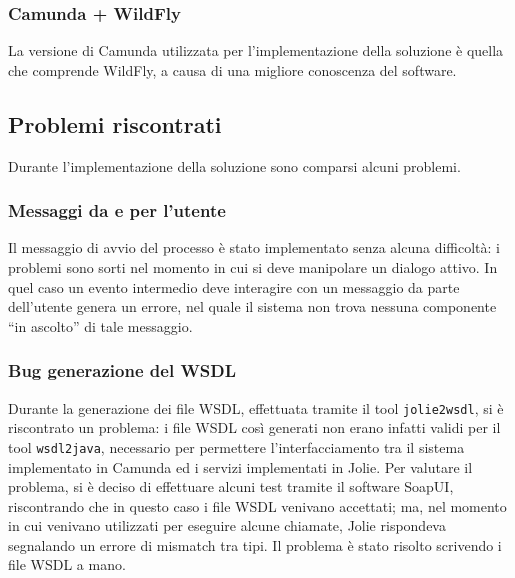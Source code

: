 \subsubsection{Camunda + WildFly}
La versione di Camunda utilizzata per l'implementazione della soluzione
\`e quella che comprende WildFly, a causa di una migliore conoscenza del
software.

\subsection{Problemi riscontrati}
Durante l'implementazione della soluzione sono comparsi alcuni problemi.
\subsubsection{Messaggi da e per l'utente}
Il messaggio di avvio del processo \`e stato implementato senza alcuna
difficolt\`a: i problemi sono sorti nel momento in cui si deve
manipolare un dialogo attivo. In quel caso un evento intermedio deve
interagire con un messaggio da parte dell'utente genera un errore, nel
quale il sistema non trova nessuna componente ``in ascolto'' di tale
messaggio.
\subsubsection{Bug generazione del WSDL}
Durante la generazione dei file WSDL, effettuata tramite il tool
{\tt jolie2wsdl}, si \`e riscontrato un problema: i file WSDL così
generati non erano infatti validi per il tool {\tt wsdl2java},
necessario per permettere l'interfacciamento tra il sistema implementato
in Camunda ed i servizi implementati in Jolie.
Per valutare il problema, si \`e deciso di effettuare alcuni test
tramite il software SoapUI, riscontrando che in questo caso i file WSDL
venivano accettati; ma, nel momento in cui venivano utilizzati per
eseguire alcune chiamate, Jolie rispondeva segnalando un errore di
mismatch tra tipi.
Il problema \`e stato risolto scrivendo i file WSDL a mano.

